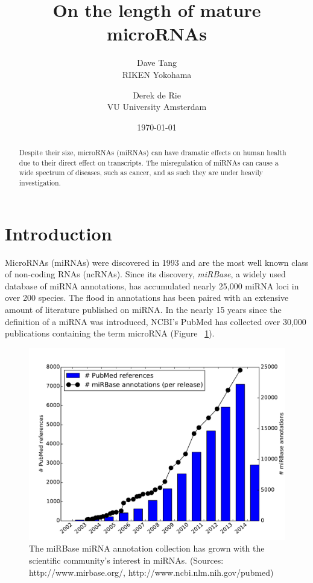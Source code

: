 \documentclass{article}
\title{On the length of mature microRNAs}
\author{Dave Tang  \\
	RIKEN Yokohama \\
	\and 
	Derek de Rie \\
	VU University Amsterdam \\
	}
\date{\today}
\begin{document}
\maketitle

\begin{abstract}
Despite their size, microRNAs (miRNAs) can have dramatic effects on human health due to their direct effect on transcripts. The misregulation of miRNAs can cause a wide spectrum of diseases, such as cancer, and as such they are under heavily investigation.

\end{abstract}

\section{Introduction}
MicroRNAs (miRNAs) were discovered in 1993\cite{pmid8252621} and are the most well known class of non-coding RNAs (ncRNAs). Since its discovery, \emph{miRBase}, a widely used database of miRNA annotations, has accumulated nearly 25,000 miRNA loci in over 200 species. The flood in annotations has been paired with an extensive amount of literature published on miRNA. In the nearly 15 years since the definition of a miRNA was introduced, NCBI's PubMed has collected over 30,000 publications containing the term microRNA (Figure ~\ref{fig:mirna_history}).

\begin{figure}[t]
   \centering
      \includegraphics[width=\textwidth,natwidth=100,natheight=100]{image/mirna_history.pdf}
      \caption{The miRBase miRNA annotation collection has grown with the scientific community's interest in miRNAs. (Sources: http://www.mirbase.org/, http://www.ncbi.nlm.nih.gov/pubmed)}
      \label{fig:mirna_history}
\end{figure}
\end{document}
